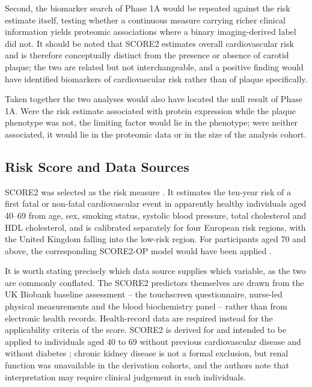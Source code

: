 Second, the biomarker search of Phase 1A would be repeated against the risk estimate itself,
testing whether a continuous measure carrying richer clinical information yields proteomic
associations where a binary imaging-derived label did not. It should be noted that SCORE2
estimates overall cardiovascular risk and is therefore conceptually distinct from the presence
or absence of carotid plaque; the two are related but not interchangeable, and a positive
finding would have identified biomarkers of cardiovascular risk rather than of plaque
specifically.

Taken together the two analyses would also have located the null result of Phase 1A. Were the
risk estimate associated with protein expression while the plaque phenotype was not, the
limiting factor would lie in the phenotype; were neither associated, it would lie in the
proteomic data or in the size of the analysis cohort.

\subsection{Risk Score and Data Sources}
SCORE2 was selected as the risk measure \cite{score22021}. It
estimates the ten-year risk of a first fatal or non-fatal cardiovascular event in apparently
healthy individuals aged 40--69 from age, sex, smoking status, systolic blood pressure, total
cholesterol and HDL cholesterol, and is calibrated separately for four European risk regions,
with the United Kingdom falling into the low-risk region. For participants aged 70 and above,
the corresponding SCORE2-OP model would have been applied
\cite{score2op2021}.

It is worth stating precisely which data source supplies which variable, as the two are commonly
conflated. The SCORE2 predictors themselves are drawn from the UK Biobank baseline assessment --
the touchscreen questionnaire, nurse-led physical measurements and the blood biochemistry panel --
rather than from electronic health records. Health-record data are required instead for the
applicability criteria of the score. SCORE2 is derived for and intended to be applied to
individuals aged 40 to 69 without previous cardiovascular disease and without diabetes
\cite{score22021}; chronic kidney disease is not a formal exclusion, but renal function was
unavailable in the derivation cohorts, and the authors note that interpretation may require
clinical judgement in such individuals.

